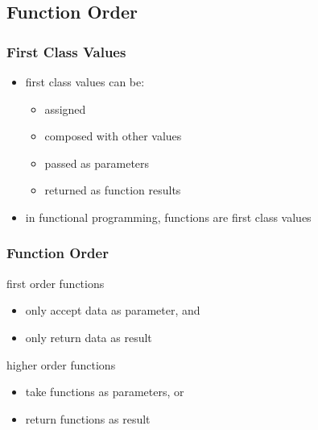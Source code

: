 \documentclass[dvipsnames]{beamer}
\theoremstyle{plain}
\begin{document}
\subsection{Function Order}

\begin{frame}
  \frametitle{First Class Values}

  \begin{itemize}
    \item \alert{first class values} can be:
    \begin{itemize}
      \item assigned
      \item composed with other values
      \item passed as parameters
      \item returned as function results
    \end{itemize}

    \medskip
    \item in functional programming, functions are first class values
  \end{itemize}
\end{frame}

\begin{frame}[fragile]
  \frametitle{Function Order}

  \begin{definition}
    \alert{first order functions}
    \begin{itemize}
      \item only accept data as parameter, and
      \item only return data as result
    \end{itemize}

    \bigskip
    \alert{higher order functions}
    \begin{itemize}
      \item take functions as parameters, or
      \item return functions as result
    \end{itemize}
  \end{definition}
\end{frame}
\end{document}
